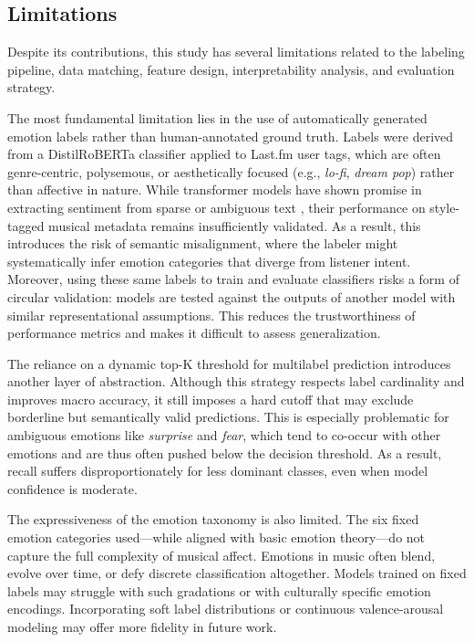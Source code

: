 \documentclass{article}
\begin{document}
\subsection{Limitations}

Despite its contributions, this study has several limitations related to the labeling pipeline, data matching, feature design, interpretability analysis, and evaluation strategy.

The most fundamental limitation lies in the use of automatically generated emotion labels rather than human-annotated ground truth. Labels were derived from a DistilRoBERTa classifier applied to Last.fm user tags, which are often genre-centric, polysemous, or aesthetically focused (e.g., \textit{lo-fi}, \textit{dream pop}) rather than affective in nature. While transformer models have shown promise in extracting sentiment from sparse or ambiguous text \parencite{Kim2024, Artemova2025}, their performance on style-tagged musical metadata remains insufficiently validated. As a result, this introduces the risk of semantic misalignment, where the labeler might systematically infer emotion categories that diverge from listener intent. Moreover, using these same labels to train and evaluate classifiers risks a form of circular validation: models are tested against the outputs of another model with similar representational assumptions. This reduces the trustworthiness of performance metrics and makes it difficult to assess generalization.

The reliance on a dynamic top-K threshold for multilabel prediction introduces another layer of abstraction. Although this strategy respects label cardinality and improves macro accuracy, it still imposes a hard cutoff that may exclude borderline but semantically valid predictions. This is especially problematic for ambiguous emotions like \textit{surprise} and \textit{fear}, which tend to co-occur with other emotions and are thus often pushed below the decision threshold. As a result, recall suffers disproportionately for less dominant classes, even when model confidence is moderate.

The expressiveness of the emotion taxonomy is also limited. The six fixed emotion categories used—while aligned with basic emotion theory—do not capture the full complexity of musical affect. Emotions in music often blend, evolve over time, or defy discrete classification altogether. Models trained on fixed labels may struggle with such gradations or with culturally specific emotion encodings. Incorporating soft label distributions or continuous valence-arousal modeling may offer more fidelity in future work.
\end{document}
